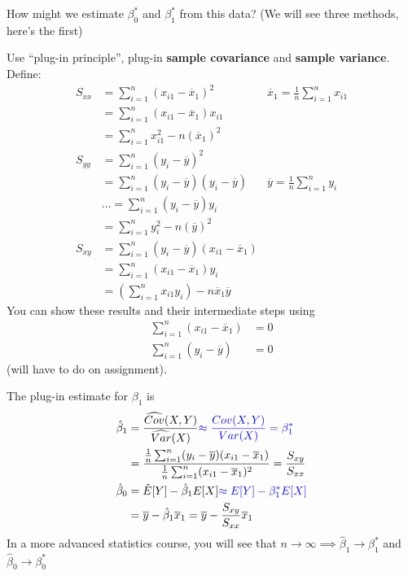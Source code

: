 \documentclass[12 pt]{article}
\begin{document}
How might we estimate $\beta_0^*$ and $\beta_1^*$ from this data? (We
will see three methods, here's the first)

Use ``plug-in principle'', plug-in \textbf{sample covariance} and
\textbf{sample variance}. Define:
\begin{align*}
  S_{xx} & = \sum_{i=1}^n (x_{i1} - \overline{x}_1)^2 & \overline{x}_1 = \frac{1}{n}\sum_{i=1}^n x_{i1}
  \\ & = \sum_{i=1}^n(x_{i1} - \overline{x}_1)x_{i1}
  \\ & = \sum_{i=1}^n x_{i1}^2 - n(\overline{x}_1)^2
  \\ S_{yy} & = \sum_{i=1}^n (y_i - \overline{y})^2
  \\ & = \sum_{i=1}^n (y_i - \overline{y}) (y_i - \overline{y}) & \overline{y} = \frac{1}{n}\sum_{i=1}^ny_i
  \\ & \ldots = \sum_{i=1}^n (y_i - \overline{y})y_i
  \\ & = \sum_{i=1}^n y_i^2 - n(\overline{y})^2
  \\ S_{xy} & = \sum_{i=1}^n (y_i - \overline{y})(x_{i1}-\overline{x}_1)
  \\ & = \sum_{i=1}^n(x_{i1} - \overline{x}_1)y_i
  \\ & = \left(\sum_{i=1}^nx_{i1}y_i\right) - n \overline{x}_1 \overline{y}
\end{align*}
You can show these results and their intermediate steps using
\begin{align*}
  \sum_{i=1}^n (x_{i1} - \overline{x}_1) & = 0
  \\ \sum_{i=1}^n (y_i - \overline{y}) & = 0
\end{align*}
(will have to do on assignment).

The plug-in estimate for $\beta_1$ is
\begin{align*}
  \hat{\beta}_1 & = \dfrac{\widehat{Cov}(X,Y)}{\widehat{Var}(X)} \textcolor{blue}{\approx \dfrac{Cov(X,Y)}{Var(X)} = \beta_1^*}
  \\ &                  = \dfrac{\frac{1}{n} \sum_{i=1}^n (y_i - \overline{y})(x_{i1}-\overline{x}_1)}{\frac{1}{n}\sum_{i=1}^n(x_{i1}-\overline{x}_1)^2} = \frac{S_{xy}}{S_{xx}}
  \\ \hat{\beta}_0 & = \hat{E}[Y] - \hat{\beta}_1 E[X] \textcolor{blue}{\approx E[Y] - \beta_1^* E[X]}
  \\ & = \overline{y} - \hat{\beta}_1 \overline{x}_1 = \overline{y} - \frac{S_{xy}}{S_{xx}}\overline{x}_1
\end{align*}
In a more advanced statistics course, you will see that $n \to \infty
\implies \hat{\beta}_1 \to \beta_1^*$ and $\hat{\beta}_0 \to
\beta_0^*$
\end{document}
